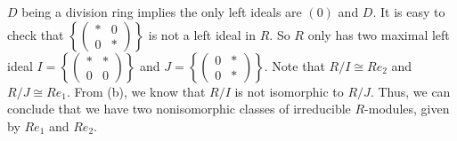 \documentclass[a4paper, 12pt]{article}
\begin{document}
\begin{solution}
\begin{enumerate}[(1)]
\(D\) being a division ring implies the only left ideals are \((0)\) and \(D\). It is easy to check that \(\left\{ \begin{pmatrix}
*&0\\ 
0&*
\end{pmatrix} \right\}\) is not a left ideal in \(R\). So \(R\) only has two maximal left ideal \(I=\left\{ \begin{pmatrix}
    *&*\\ 
    0&0
\end{pmatrix} \right\}\) and \(J=\left\{ \begin{pmatrix}
    0&*\\ 
    0&*
\end{pmatrix} \right\}\). Note that \(R/I\cong Re_2\) and \(R/J\cong Re_1\). From (b), we know that \(R/I\) is not isomorphic to \(R/J\). Thus, we can 
conclude that we have two nonisomorphic classes of irreducible \(R\)-modules, given by \(Re_1\) and \(Re_2\).
\end{enumerate}
\end{solution}
\end{document}
